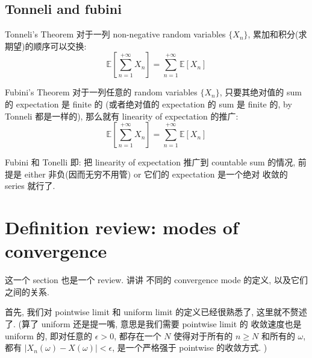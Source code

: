 \subsection{Tonneli and fubini}
\begin{theorem}{Tonneli's Theorem}
对于一列 non-negative random variables 
\(\{X_n\}\), 累加和积分(求期望)的顺序可以交换:
$$
\mathbb{E}\left[\sum_{n=1}^{+\infty} X_n\right]=\sum_{n=1}^{+\infty} \mathbb{E}\left[X_n\right]
$$
\end{theorem}

\begin{theorem}{Fubini's Theorem}
对于一列任意的 random variables \(\{X_n\}\),
只要其绝对值的 sum 的 expectation 是 finite 的 
(或者绝对值的 expectation 的 sum 是 finite 的,
by Tonneli 都是一样的),
那么就有 linearity of expectation 的推广:
$$
\mathbb{E}\left[\sum_{n=1}^{+\infty} X_n\right]=\sum_{n=1}^{+\infty} \mathbb{E}\left[X_n\right]
$$
\end{theorem}

\begin{remark}
Fubini 和 Tonelli 即: 
把 linearity of expectation 推广到 countable sum 的情况,
前提是 either 非负(因而无穷不用管) or 它们的 expectation 是一个绝对
收敛的 series 就行了.
\end{remark}

\section{Definition review: modes of convergence}
这一个 section 也是一个 review. 讲讲
不同的 convergence mode 的定义, 以及它们之间的关系.

首先, 我们对 pointwise limit 和 
uniform limit 的定义已经很熟悉了, 
这里就不赘述了.
(算了 uniform 还是提一嘴, 
意思是我们需要 pointwise limit 的
收敛速度也是 uniform 的, 
即对任意的 $\epsilon > 0$, 
都存在一个 $N$ 使得对于所有的 $n \ge N$ 
和所有的 $\omega$, 
都有 $|X_n(\omega) - X(\omega)| < \epsilon$,
是一个严格强于 pointwise 的收敛方式.
)

